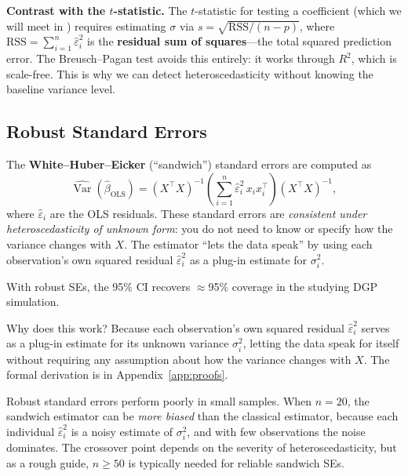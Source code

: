 \documentclass[11pt,a4paper]{article}
\theoremstyle{definition}
\theoremstyle{plain}
\theoremstyle{remark}
\newcommand{\Var}{\operatorname{Var}}
\newcommand{\bols}{\hat{\beta}_{\text{OLS}}}
\begin{document}
\textbf{Contrast with the $t$-statistic.} The $t$-statistic for testing a coefficient (which we will meet in ) requires estimating $\sigma$ via $s = \sqrt{\text{RSS}/(n-p)}$, where $\text{RSS} = \sum_{i=1}^n \hat\varepsilon_i^2$ is the \textbf{residual sum of squares}---the total squared prediction error. The Breusch--Pagan test avoids this entirely: it works through $R^2$, which is scale-free. This is why we can detect heteroscedasticity without knowing the baseline variance level.

\subsection{Robust Standard Errors}

\begin{repairbox}
The \textbf{White--Huber--Eicker} (``sandwich'') standard errors are computed as
\[
  \widehat{\Var}(\bols) = (X^\top X)^{-1} \left(\sum_{i=1}^n \hat\varepsilon_i^2\, x_i x_i^\top\right) (X^\top X)^{-1},
\]
where $\hat\varepsilon_i$ are the OLS residuals.  These standard errors are \emph{consistent under heteroscedasticity of unknown form}: you do not need to know or specify how the variance changes with $X$. The estimator ``lets the data speak'' by using each observation's own squared residual $\hat\varepsilon_i^2$ as a plug-in estimate for $\sigma_i^2$.

With robust SEs, the 95\% CI recovers $\approx$95\% coverage in the studying DGP simulation.
\end{repairbox}

Why does this work? Because each observation's own squared residual $\hat\varepsilon_i^2$ serves as a plug-in estimate for its unknown variance $\sigma_i^2$, letting the data speak for itself without requiring any assumption about how the variance changes with $X$. The formal derivation is in Appendix~\ref{app:proofs}.

\begin{warningbox}
Robust standard errors perform poorly in small samples.
When $n = 20$, the sandwich estimator can be \emph{more biased} than the classical estimator, because each individual $\hat\varepsilon_i^2$ is a noisy estimate of $\sigma_i^2$, and with few observations the noise dominates.
The crossover point depends on the severity of heteroscedasticity, but as a rough guide, $n \geq 50$ is typically needed for reliable sandwich SEs.
\end{warningbox}


\end{document}
